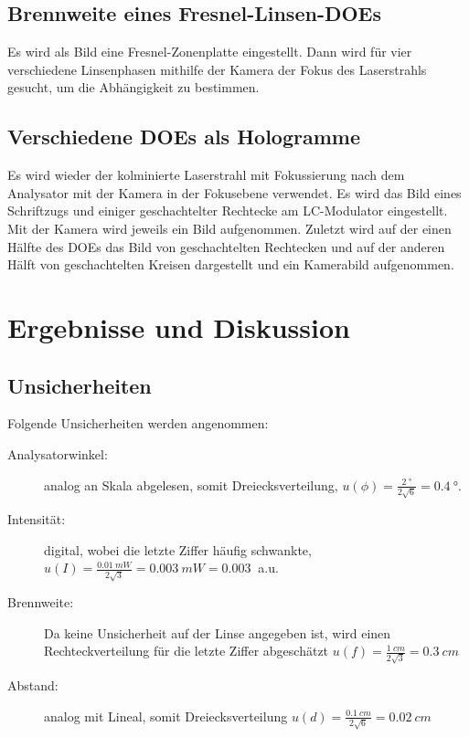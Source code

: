 \documentclass[
	a4paper,
	12pt,
	pagesize,
	ngerman
]{scrartcl}
\begin{document}
	\subsection{Brennweite eines Fresnel-Linsen-DOEs}
		Es wird als Bild eine Fresnel-Zonenplatte eingestellt.
		Dann wird für vier verschiedene Linsenphasen mithilfe der Kamera der Fokus des Laserstrahls gesucht, um die Abhängigkeit zu bestimmen.

	\subsection{Verschiedene DOEs als Hologramme}
		Es wird wieder der kolminierte Laserstrahl mit Fokussierung nach dem Analysator mit der Kamera in der Fokusebene verwendet.
		Es wird das Bild eines Schriftzugs und einiger geschachtelter Rechtecke am LC-Modulator eingestellt. %
		Mit der Kamera wird jeweils ein Bild aufgenommen.
		Zuletzt wird auf der einen Hälfte des DOEs das Bild von geschachtelten Rechtecken und auf der anderen Hälft von geschachtelten Kreisen dargestellt und ein Kamerabild aufgenommen.



	\section{Ergebnisse und Diskussion}
		\subsection*{Unsicherheiten}

	Folgende Unsicherheiten werden angenommen:
	\begin{description}
		\item[Analysatorwinkel:] analog an Skala abgelesen, somit Dreiecksverteilung, $u(\phi)=\frac{\SI{2}{\degree}}{2\sqrt{6}}=\SI{0.4}{\degree}$.
		\item[Intensität:] digital, wobei die letzte Ziffer häufig schwankte, $u(I)=\frac{\SI{0.01}{mW}}{2\sqrt{3}}=\SI{0.003}{mW}=\SI{0.003}{}$ a.u.
		\item[Brennweite:] Da keine Unsicherheit auf der Linse angegeben ist, wird einen Rechteckverteilung für die letzte Ziffer abgeschätzt $u(f)=\frac{\SI{1}{cm}}{2\sqrt{3}}= \SI{0.3}{cm}$
		\item[Abstand:] analog mit Lineal, somit Dreiecksverteilung $u(d)=\frac{\SI{0.1}{cm}}{2\sqrt{6}}= \SI{0.02}{cm}$
	\end{description}
\end{document}
